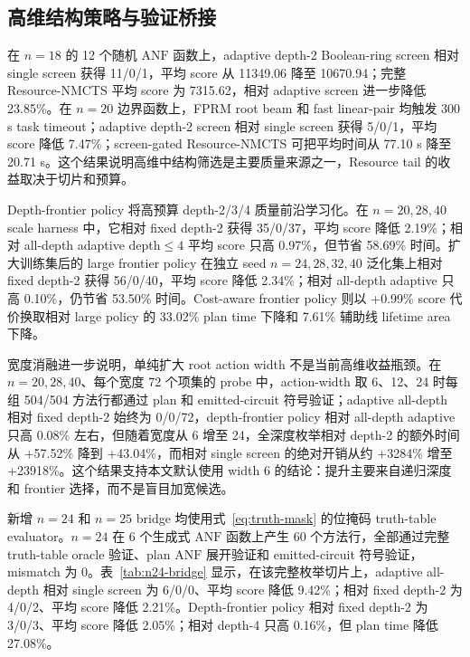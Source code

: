 \documentclass[UTF8,fontset=macnew,11pt]{ctexart}
\newcommand{\method}{Resource-NMCTS}
\newcommand{\anf}{\ensuremath{\mathrm{ANF}}}
\newcommand{\ttable}{truth-table}
\begin{document}
\subsection{高维结构策略与验证桥接}

在 $n=18$ 的 12 个随机 \anf{} 函数上，adaptive depth-2 Boolean-ring screen 相对 single screen 获得 11/0/1，平均 score 从 11349.06 降至 10670.94；完整 \method{} 平均 score 为 7315.62，相对 adaptive screen 进一步降低 23.85\%。在 $n=20$ 边界函数上，FPRM root beam 和 fast linear-pair 均触发 300 s task timeout；adaptive depth-2 screen 相对 single screen 获得 5/0/1，平均 score 降低 7.47\%；screen-gated \method{} 可把平均时间从 77.10 s 降至 20.71 s。这个结果说明高维中结构筛选是主要质量来源之一，Resource tail 的收益取决于切片和预算。

Depth-frontier policy 将高预算 depth-2/3/4 质量前沿学习化。在 $n=20,28,40$ scale harness 中，它相对 fixed depth-2 获得 35/0/37，平均 score 降低 2.19\%；相对 all-depth adaptive depth$\leq4$ 平均 score 只高 0.97\%，但节省 58.69\% 时间。扩大训练集后的 large frontier policy 在独立 seed $n=24,28,32,40$ 泛化集上相对 fixed depth-2 获得 56/0/40，平均 score 降低 2.34\%；相对 all-depth adaptive 只高 0.10\%，仍节省 53.50\% 时间。Cost-aware frontier policy 则以 +0.99\% score 代价换取相对 large policy 的 33.02\% plan time 下降和 7.61\% 辅助线 lifetime area 下降。

宽度消融进一步说明，单纯扩大 root action width 不是当前高维收益瓶颈。在 $n=20,28,40$、每个宽度 72 个项集的 probe 中，action-width 取 6、12、24 时每组 504/504 方法行都通过 plan 和 emitted-circuit 符号验证；adaptive all-depth 相对 fixed depth-2 始终为 0/0/72，depth-frontier policy 相对 all-depth adaptive 只高 0.08\% 左右，但随着宽度从 6 增至 24，全深度枚举相对 depth-2 的额外时间从 +57.52\% 降到 +43.04\%，而相对 single screen 的绝对开销从约 +3284\% 增至 +23918\%。这个结果支持本文默认使用 width 6 的结论：提升主要来自递归深度和 frontier 选择，而不是盲目加宽候选。

新增 $n=24$ 和 $n=25$ bridge 均使用式~\eqref{eq:truth-mask} 的位掩码 truth-table evaluator。$n=24$ 在 6 个生成式 \anf{} 函数上产生 60 个方法行，全部通过完整 \ttable{} oracle 验证、plan \anf{} 展开验证和 emitted-circuit 符号验证，mismatch 为 0。表~\ref{tab:n24-bridge} 显示，在该完整枚举切片上，adaptive all-depth 相对 single screen 为 6/0/0、平均 score 降低 9.42\%；相对 fixed depth-2 为 4/0/2、平均 score 降低 2.21\%。Depth-frontier policy 相对 fixed depth-2 为 3/0/3、平均 score 降低 2.05\%；相对 depth-4 只高 0.16\%，但 plan time 降低 27.08\%。
\end{document}
